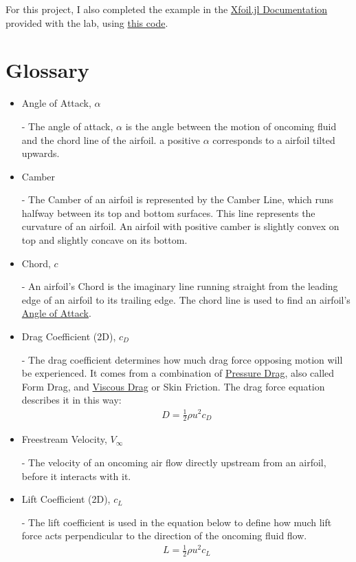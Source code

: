 \documentclass{article}
\begin{document}
For this project, I also completed the example in the \href{https://flow.byu.edu/Xfoil.jl/stable/}{Xfoil.jl Documentation} provided with the lab, using \href{https://github.com/JoeSpencer1/497R-Projects/blob/Airfoil-Analysis/Demo.jl}{this code}.

\clearpage

\section{Glossary}
\begin{itemize}
		
	\item \hypertarget{alpha}{Angle of Attack, $\alpha$} - The angle of attack, $\alpha$ is the angle between the motion of oncoming fluid and the chord line of the airfoil. a positive $\alpha$ corresponds to a airfoil tilted upwards.
	
	\item \hypertarget{Camber}{Camber} - The Camber of an airfoil is represented by the Camber Line, which runs halfway between its top and bottom surfaces. This line represents the curvature of an airfoil. An airfoil with positive camber is slightly convex on top and slightly concave on its bottom.
	
	\item \hypertarget{c}{Chord, $c$} - An airfoil's Chord is the imaginary line running straight from the leading edge of an airfoil to its trailing edge. The chord line is used to find an airfoil's \hyperlink{alpha}{Angle of Attack}.

	\item \hypertarget{CD}{Drag Coefficient (2D), $c_{D}$} - The drag coefficient determines how much drag force opposing motion will be experienced. It comes from a combination of \hyperlink{DP}{Pressure Drag}, also called Form Drag, and \hyperlink{VD}{Viscous Drag} or Skin Friction. The drag force equation describes it in this way: 
		\begin{equation} \label{eq:13}
		\begin{aligned}
        			D = \frac{1}{2} \rho u^{2} c_{D}
	    	\end{aligned}
		\end{equation}
	
	\item \hypertarget{Vinf}{Freestream Velocity, $V_{\infty}$} - The velocity of an oncoming air flow directly upstream from an airfoil, before it interacts with it.
		
	\item \hypertarget{CL}{Lift Coefficient (2D), $c_{L}$} - The lift coefficient is used in the equation below to define how much lift force acts perpendicular to the direction of the oncoming fluid flow.
		\begin{equation} \label{eq:14}
		\begin{aligned}
        			L = \frac{1}{2} \rho u^{2} c_{L}
	    	\end{aligned}
		\end{equation}
	

\end{itemize}
\end{document}

